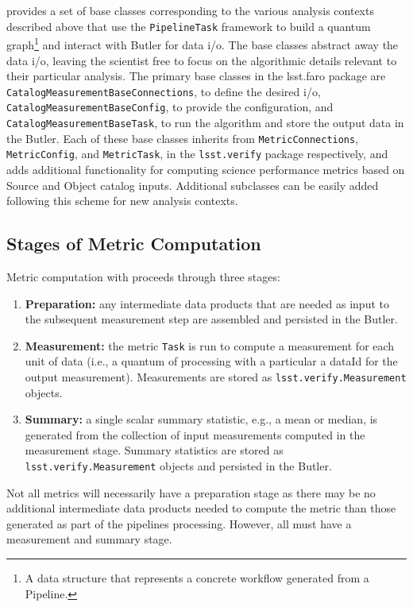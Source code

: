 \faro provides a set of base classes corresponding to the various analysis contexts described above that use the \texttt{PipelineTask} framework to build a quantum graph\footnote{A data structure that represents a concrete workflow generated from a Pipeline.} and interact with Butler for data i/o.
The base classes abstract away the data i/o, leaving the scientist free to focus on the algorithmic details  relevant to their particular analysis.
The primary base classes in the lsst.faro package are \texttt{CatalogMeasurementBaseConnections}, to define the desired i/o, \texttt{CatalogMeasurementBaseConfig}, to provide the configuration, and \texttt{CatalogMeasurementBaseTask}, to run the algorithm and store the output data in the Butler.
Each of these base classes inherits from \texttt{MetricConnections}, \texttt{MetricConfig}, and \texttt{MetricTask}, in the \texttt{lsst.verify} package respectively, and adds additional functionality for computing science performance metrics based on Source and Object catalog inputs.
Additional subclasses can be easily added following this scheme for new analysis contexts.

\subsection{Stages of Metric Computation} \label{ssec:stages}

Metric computation with \faro proceeds through three stages:
\begin{enumerate}
\item \textbf{Preparation:} any intermediate data products that are needed as input to the subsequent measurement step are assembled and persisted in the Butler.
\item \textbf{Measurement:} the metric \texttt{Task} is run to compute a measurement for each unit of data (i.e., a quantum of processing with a particular a dataId for the output measurement). Measurements are stored as \texttt{lsst.verify.Measurement} objects.
\item \textbf{Summary:} a single scalar summary statistic, e.g., a mean or median,  is generated from the collection of input measurements computed in the measurement stage. Summary statistics are stored as \texttt{lsst.verify.Measurement} objects and persisted in the Butler.
\end{enumerate}
Not all metrics will necessarily have a preparation stage as there may be no additional intermediate data products needed to compute the metric than those generated as part of the pipelines processing. However, all must have a measurement and summary stage.

